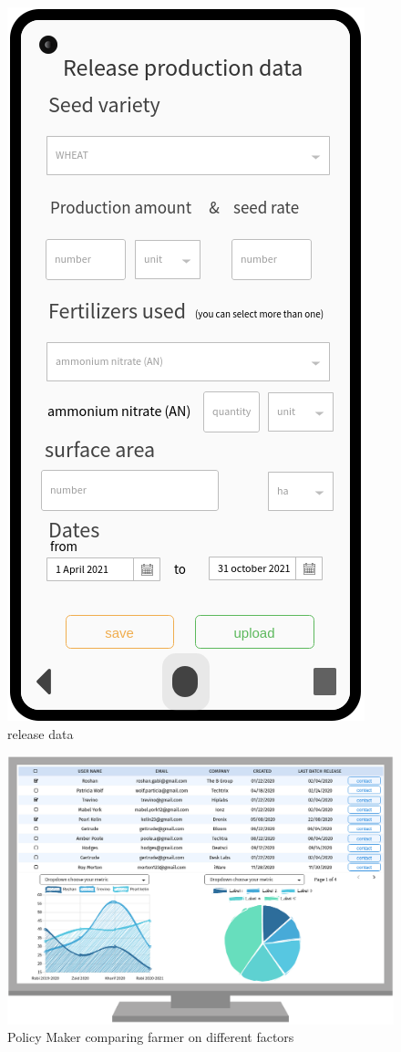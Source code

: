 \begin{figure}[H]
\begin{minipage}{0.48\textwidth}
		\label{Fig:interface_meteo}

	\end{minipage}\hfill

\end{figure}

\begin{figure}[H]
	
	\centering
	
	\includegraphics[width=0.3\columnwidth]{Images/release_prod_data.png}
	
	\caption{release data}
	
	\label{Fig:interface_release_data}
	
\end{figure}

\begin{figure}[H]

	\centering

	\includegraphics[width=0.8\columnwidth]{Images/release_data_interface.png}

	\caption{Policy Maker comparing farmer on different factors}

	\label{Fig:interface_visu_farmers}

\end{figure}



